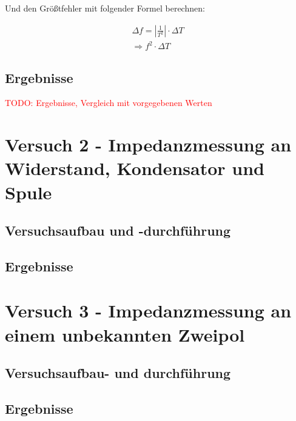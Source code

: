     Und den Größtfehler mit folgender Formel berechnen:

    \begin{equation}
        \begin{aligned}
            \Delta f = \left |\frac{1}{T^2} \right | \cdot \Delta T \\
            \Rightarrow f^2 \cdot \Delta T
        \label{eq:Versuch1_Frequenz_Fehler}
        \end{aligned}
    \end{equation}
        
    
    \subsection{Ergebnisse}
    \textcolor{red}{TODO: Ergebnisse, Vergleich mit vorgegebenen Werten}


\section{Versuch 2 - Impedanzmessung an Widerstand, Kondensator und Spule}
    
    \subsection{Versuchsaufbau und -durchführung}
        

    \subsection{Ergebnisse}


\section{Versuch 3 - Impedanzmessung an einem unbekannten Zweipol}
    
    \subsection{Versuchsaufbau- und durchführung}

    \subsection{Ergebnisse}
    
